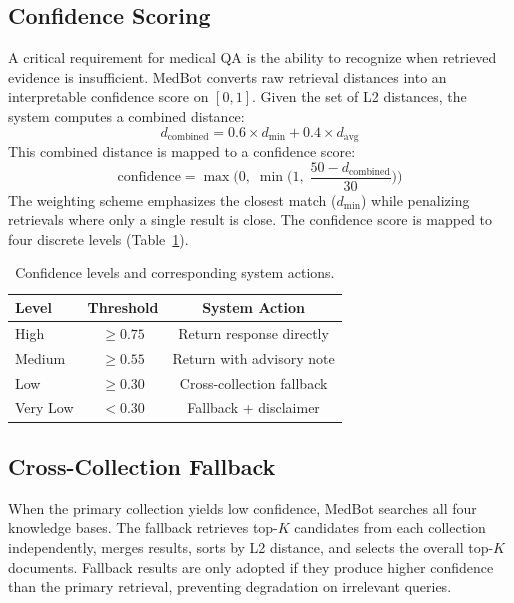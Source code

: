 \documentclass[11pt,a4paper]{article}
\begin{document}
\subsection{Confidence Scoring}

A critical requirement for medical QA is the ability to recognize when retrieved evidence is insufficient. MedBot converts raw retrieval distances into an interpretable confidence score on $[0,1]$. Given the set of L2 distances, the system computes a combined distance:
\begin{equation}
    d_{\text{combined}} = 0.6 \times d_{\min} + 0.4 \times d_{\text{avg}}
\end{equation}
This combined distance is mapped to a confidence score:
\begin{equation}
    \text{confidence} = \max\!\Big(0,\; \min\!\Big(1,\; \frac{50 - d_{\text{combined}}}{30}\Big)\Big)
\end{equation}
The weighting scheme emphasizes the closest match ($d_{\min}$) while penalizing retrievals where only a single result is close. The confidence score is mapped to four discrete levels (Table~\ref{tab:confidence}).

\begin{table}[t]
\centering
\caption{Confidence levels and corresponding system actions.}
\label{tab:confidence}
\begin{tabular}{@{}lcc@{}}
\toprule
\textbf{Level} & \textbf{Threshold} & \textbf{System Action} \\
\midrule
High     & $\geq 0.75$ & Return response directly \\
Medium   & $\geq 0.55$ & Return with advisory note \\
Low      & $\geq 0.30$ & Cross-collection fallback \\
Very Low & $< 0.30$    & Fallback + disclaimer \\
\bottomrule
\end{tabular}
\end{table}

\subsection{Cross-Collection Fallback}

When the primary collection yields low confidence, MedBot searches all four knowledge bases. The fallback retrieves top-$K$ candidates from each collection independently, merges results, sorts by L2 distance, and selects the overall top-$K$ documents. Fallback results are only adopted if they produce higher confidence than the primary retrieval, preventing degradation on irrelevant queries.
\end{document}
